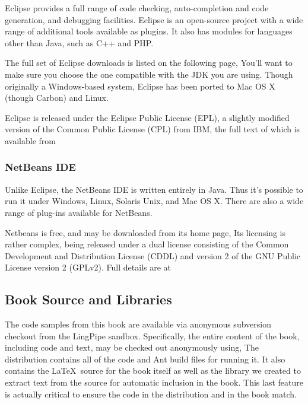 Eclipse provides a full range of code checking, auto-completion
and code generation, and debugging facilities.  Eclipse is an open-source
project with a wide range of additional tools available as plugins.  It
also has modules for languages other than Java, such as C++ and PHP.

The full set of Eclipse downloads is listed on the following page,
%
%
You'll want to make sure you choose the one compatible with the JDK
you are using.  Though originally a Windows-based system, Eclipse has been
ported to Mac OS X (though Carbon) and Linux.  

Eclipse is released under the Eclipse Public License (EPL), a slightly modified
version of the Common Public License (CPL) from IBM, the full text of which is
available from
%


\subsubsection{NetBeans IDE}

Unlike Eclipse, the NetBeans IDE is written entirely in Java.  Thus
it's possible to run it under Windows, Linux, Solaris Unix, and Mac OS
X. There are also a wide range of plug-ins available for NetBeans.

Netbeans is free, and may be downloaded from its home page,
%
%
Its licensing is rather complex, being released under a dual license
consisting of the Common Development and Distribution License (CDDL)
and version 2 of the GNU Public License version 2 (GPLv2).  Full details
are at
%


\subsection{Book Source and Libraries}

The code samples from this book are available via anonymous subversion checkout
from the LingPipe sandbox.  Specifically, the entire content of the book,
including code and text, may be checked out anonymously using,
%
%
The distribution contains all of the code and Ant build files for
running it.  It also contains the \LaTeX\ source for the book itself
as well as the library we created to extract text from the source for
automatic inclusion in the book.  This last feature is actually
critical to ensure the code in the distribution and in the book match.  


